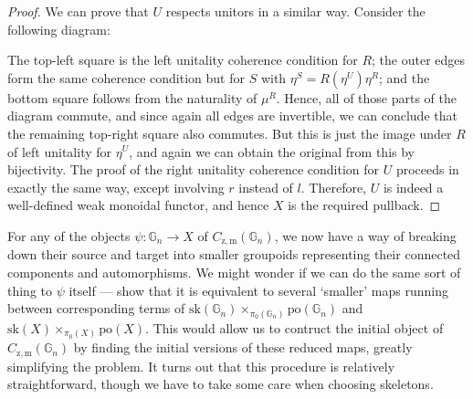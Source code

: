 \documentclass{amsart} %
\newenvironment{eq*}{\begin{equation*}}{\end{equation*}}
\begin{document}
\begin{proof}
We can prove that $U$ respects unitors in a similar way. Consider the following diagram:
\begin{eq*} 
\end{eq*}
The top-left square is the left unitality coherence condition for $R$; the outer edges form the same coherence condition but for $S$ with $\eta^S = R(\eta^U) \eta^R$; and the bottom square follows from the naturality of $\mu^R$. Hence, all of those parts of the diagram commute, and since again all edges are invertible, we can conclude that the remaining top-right square also commutes. But this is just the image under $R$ of left unitality for $\eta^U$, and again we can obtain the original from this by bijectivity. The proof of the right unitality coherence condition for $U$ proceeds in exactly the same way, except involving $r$ instead of $l$. Therefore, $U$ is indeed a well-defined weak monoidal functor, and hence $X$ is the required pullback.
\end{proof}

For any of the objects $\psi : \mathbb{G}_n \to X$ of $C_{\mathrm{z}, \mathrm{m}}(\mathbb{G}_n)$, we now have a way of breaking down their source and target into smaller groupoids representing their connected components and automorphisms. We might wonder if we can do the same sort of thing to $\psi$ itself --- show that it is equivalent to several `smaller' maps running between corresponding terms of $\mathrm{sk}(\mathbb{G}_n) \times_{\pi_0(\mathbb{G}_n)} \mathrm{po}(\mathbb{G}_n)$ and $\mathrm{sk}(X) \times_{\pi_0(X)} \mathrm{po}(X)$. This would allow us to contruct the initial object of $C_{\mathrm{z}, \mathrm{m}}(\mathbb{G}_n)$ by finding the initial versions of these reduced maps, greatly simplifying the problem. It turns out that this procedure is relatively straightforward, though we have to take some care when choosing skeletons.
\end{document}
